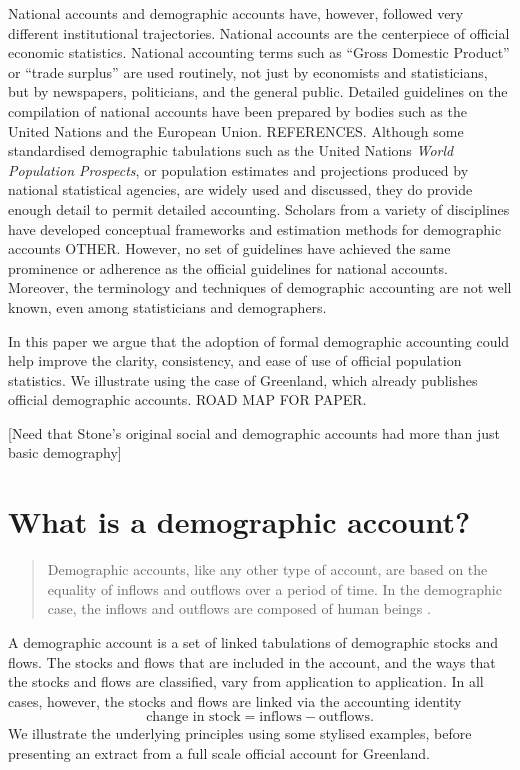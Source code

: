 \documentclass[USenglish]{article}
\begin{document}
National accounts and demographic accounts have, however, followed very different institutional trajectories. National accounts are the centerpiece of official economic statistics. National accounting terms such as ``Gross Domestic Product'' or ``trade surplus'' are used routinely, not just by economists and statisticians, but by newspapers, politicians, and the general public. Detailed guidelines on the compilation of national accounts have been prepared by bodies such as the United Nations and the European Union. REFERENCES. Although some standardised demographic tabulations such as the United Nations \emph{World Population Prospects}, or population estimates and projections produced by national statistical agencies, are widely used and discussed, they do provide enough detail to permit detailed accounting. Scholars from a variety of disciplines have developed conceptual frameworks and estimation methods for demographic accounts \citep{rees1977spatial,rees1986data, rees1979regional,rees1985choices,rees2012ethnic,bryant2013bayesian, wheldon2013reconstructing,willekens2011population} OTHER. However, no set of guidelines have achieved the same prominence or adherence as the official guidelines for national accounts.  Moreover, the terminology and techniques of demographic accounting are not well known, even among statisticians and demographers.

In this paper we argue that the adoption of formal demographic accounting could help improve the clarity, consistency, and ease of use of official population statistics. We illustrate using the case of Greenland, which already publishes official demographic accounts. ROAD MAP FOR PAPER.

[Need that Stone's original social and demographic accounts had more than just basic demography]


\section{What is a demographic account?}

\begin{quote}
Demographic accounts, like any other type of account, are based on the equality of inflows and outflows over a period of time. In the demographic case, the inflows and outflows are composed of human beings \citep[][p. 26]{stone1984accounts}.
\end{quote}

A demographic account is a set of linked tabulations of demographic stocks and flows. The stocks and flows that are included in the account, and the ways that the stocks and flows are classified, vary from application to application. In all cases, however, the stocks and flows are linked via the accounting identity
\begin{equation*}
    \text{change in stock} = \text{inflows} - \text{outflows}.
\end{equation*}
We illustrate the underlying principles using some stylised examples, before presenting an extract from a full scale official account for Greenland.
\end{document}
